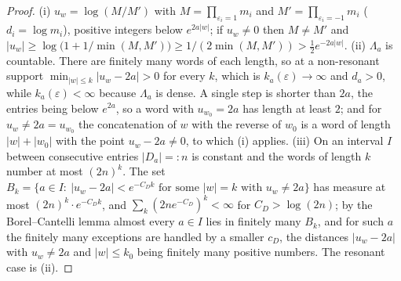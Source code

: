 \documentclass[11pt]{article}
\theoremstyle{definition}
\theoremstyle{remark}
\begin{document}
\begin{proof}
(i) $u_w=\log(M/M')$ with $M=\prod_{\varepsilon_i=1}m_i$ and $M'=\prod_{\varepsilon_i=-1}m_i$ ($d_i=\log m_i$), positive integers below $e^{2a|w|}$; if $u_w\ne0$ then $M\ne M'$ and $|u_w|\ge\log\big(1+1/\min(M,M')\big)\ge1/(2\min(M,M'))>\tfrac12e^{-2a|w|}$. (ii) $\Lambda_a$ is countable. There are finitely many words of each length, so at a non-resonant support $\min_{|w|\le k}|u_w-2a|>0$ for every $k$, which is $k_a(\varepsilon)\to\infty$ and $d_a>0$, while $k_a(\varepsilon)<\infty$ because $\Lambda_a$ is dense. A single step is shorter than $2a$, the entries being below $e^{2a}$, so a word with $u_{w_0}=2a$ has length at least $2$; and for $u_w\ne2a=u_{w_0}$ the concatenation of $w$ with the reverse of $w_0$ is a word of length $|w|+|w_0|$ with the point $u_w-2a\ne0$, to which (i) applies.
(iii) On an interval $I$ between consecutive entries $|D_a|=:n$ is constant and the words of length $k$ number at most $(2n)^k$. The set $B_k=\{a\in I:\ |u_w-2a|<e^{-C_Dk}\text{ for some }|w|=k\text{ with }u_w\ne2a\}$ has measure at most $(2n)^k\cdot e^{-C_Dk}$, and $\sum_k(2ne^{-C_D})^k<\infty$ for $C_D>\log(2n)$; by the Borel--Cantelli lemma almost every $a\in I$ lies in finitely many $B_k$, and for such $a$ the finitely many exceptions are handled by a smaller $c_D$, the distances $|u_w-2a|$ with $u_w\ne2a$ and $|w|\le k_0$ being finitely many positive numbers. The resonant case is (ii).
\end{proof}
\end{document}
